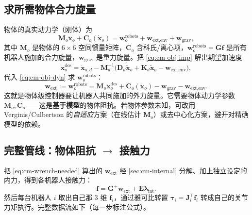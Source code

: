 \subsection{求所需物体合力旋量}
\label{sec:cm-impedance-wrench}
物体的真实动力学（刚体）为
\begin{equation}
  \mathbf{M}_o\ddot{\mathbf{x}}_o+\mathbf{C}_o(\dot{\mathbf{x}}_o)=\mathbf{w}_o^{\text{robots}}+\mathbf{w}_{\text{ext,env}}+\mathbf{w}_{\text{grav}},
  \label{eq:cm-obj-dyn}
\end{equation}
其中 $\mathbf{M}_o$ 是物体的 $6\times 6$ 空间惯量矩阵，$\mathbf{C}_o$ 含科氏/离心项，$\mathbf{w}_o^{\text{robots}}=\mathbf{G}\mathbf{f}$ 是所有机器人施加的合力旋量，$\mathbf{w}_{\text{grav}}$ 是重力旋量。把 \cref{eq:cm-obj-imp} 解出期望加速度
\[
  \ddot{\mathbf{x}}_o^{\text{des}}=\ddot{\mathbf{x}}_{o,d}-\mathbf{M}_d^{-1}\big(\mathbf{D}_d\dot{\tilde{\mathbf{x}}}_o+\mathbf{K}_d\tilde{\mathbf{x}}_o-\mathbf{w}_{\text{ext,env}}\big),
\]
代入 \cref{eq:cm-obj-dyn} 求 $\mathbf{w}_o^{\text{robots}}$：
\begin{equation}
\boxed{\;
  \mathbf{w}_{\text{ext}}:=\mathbf{w}_o^{\text{robots}}=\mathbf{M}_o\ddot{\mathbf{x}}_o^{\text{des}}+\mathbf{C}_o(\dot{\mathbf{x}}_o)-\mathbf{w}_{\text{grav}}-\mathbf{w}_{\text{ext,env}}.
\;}
  \label{eq:cm-wrench-needed}
\end{equation}
这就是物体级控制器要让机器人共同施加的外力旋量。它需要物体动力学参数 $\mathbf{M}_o,\mathbf{C}_o$——这是\textbf{基于模型}的物体阻抗。若物体参数未知，可改用 Verginis/Culbertson 的\emph{自适应}方案（在线估计 $\mathbf{M}_o$）或去中心化方案，避开对精确模型的依赖。

\subsection{完整管线：物体阻抗 \texorpdfstring{$\to$}{->} 接触力}
\label{sec:cm-impedance-pipeline}
把 \cref{eq:cm-wrench-needed} 算出的 $\mathbf{w}_{\text{ext}}$ 经 \cref{sec:cm-internal} 分解、加上独立设定的内力，得到各机器人接触力：
\begin{equation}
  \mathbf{f}=\mathbf{G}^{+}\mathbf{w}_{\text{ext}}+\mathbf{E}\boldsymbol{\lambda}_{\text{int}}.
  \label{eq:cm-imp-compose}
\end{equation}
然后每台机器人 $i$ 取出自己那 $3$ 维 $\mathbf{f}_i$，通过雅可比转置 $\boldsymbol{\tau}_i=\mathbf{J}_i^\top\mathbf{f}_i$ 转成自己的关节力矩执行。完整数据流如下（每一步标注公式）。

